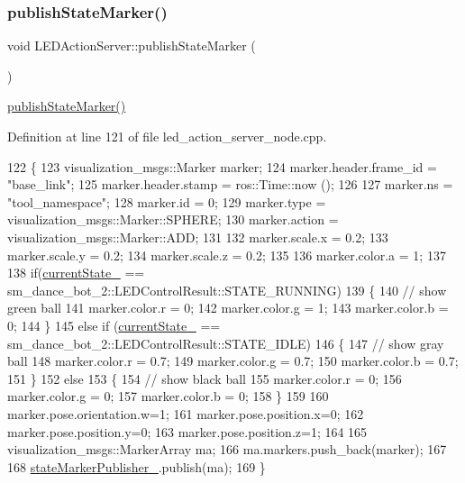 \subsubsection{\texorpdfstring{publish\+State\+Marker()}{publishStateMarker()}\hspace{0.1cm}{\footnotesize\ttfamily [5/5]}}
{\footnotesize\ttfamily void L\+E\+D\+Action\+Server\+::publish\+State\+Marker (\begin{DoxyParamCaption}{ }\end{DoxyParamCaption})\hspace{0.3cm}{\ttfamily [inline]}}

\hyperlink{classLEDActionServer_a73bb754ac2347c50660624ad92315895}{publish\+State\+Marker()} 

Definition at line 121 of file led\+\_\+action\+\_\+server\+\_\+node.\+cpp.


\begin{DoxyCode}
122 \{
123     visualization\_msgs::Marker marker;
124     marker.header.frame\_id = \textcolor{stringliteral}{"base\_link"};
125     marker.header.stamp = ros::Time::now ();
126 
127     marker.ns = \textcolor{stringliteral}{"tool\_namespace"};
128     marker.id = 0;
129     marker.type = visualization\_msgs::Marker::SPHERE;
130     marker.action = visualization\_msgs::Marker::ADD;
131     
132     marker.scale.x = 0.2;
133     marker.scale.y = 0.2;
134     marker.scale.z = 0.2;
135 
136     marker.color.a = 1;
137 
138     \textcolor{keywordflow}{if}(\hyperlink{classLEDActionServer_a1dc456e987dc331501ad6ff2215661ff}{currentState\_} == sm\_dance\_bot\_2::LEDControlResult::STATE\_RUNNING)
139     \{
140       \textcolor{comment}{// show green ball}
141       marker.color.r = 0;
142       marker.color.g = 1;
143       marker.color.b = 0;
144     \}
145     \textcolor{keywordflow}{else} \textcolor{keywordflow}{if} (\hyperlink{classLEDActionServer_a1dc456e987dc331501ad6ff2215661ff}{currentState\_} == sm\_dance\_bot\_2::LEDControlResult::STATE\_IDLE)
146     \{
147       \textcolor{comment}{// show gray ball}
148       marker.color.r = 0.7;
149       marker.color.g = 0.7;
150       marker.color.b = 0.7;
151     \}
152     \textcolor{keywordflow}{else}
153     \{
154       \textcolor{comment}{// show black ball}
155       marker.color.r = 0;
156       marker.color.g = 0;
157       marker.color.b = 0;
158     \}
159 
160     marker.pose.orientation.w=1;
161     marker.pose.position.x=0;
162     marker.pose.position.y=0;
163     marker.pose.position.z=1;
164 
165     visualization\_msgs::MarkerArray ma;
166     ma.markers.push\_back(marker);
167 
168     \hyperlink{classLEDActionServer_a4168a1e4a17eb1d65aaa059ce0c52086}{stateMarkerPublisher\_}.publish(ma);
169 \}
\end{DoxyCode}
\mbox{\label{classLEDActionServer_ae8e1b2d4bf0a85eec3ffd1c7d4f08490}} 
